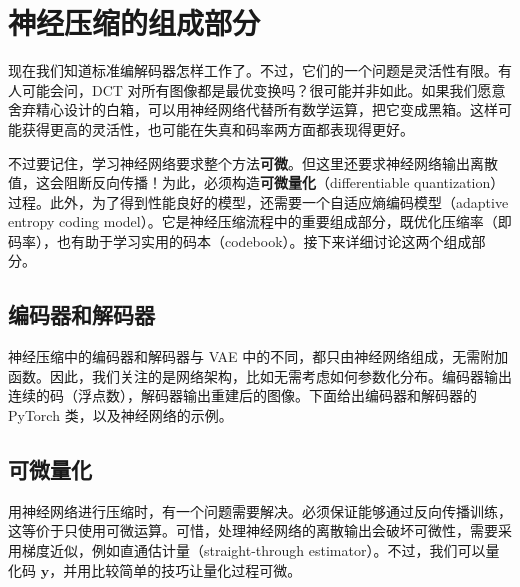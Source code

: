 \section{神经压缩的组成部分}
\label{sec:10-04}

现在我们知道标准编解码器怎样工作了。不过，它们的一个问题是灵活性有限。有人可能会问，DCT 对所有图像都是最优变换吗？很可能并非如此。如果我们愿意舍弃精心设计的白箱，可以用神经网络代替所有数学运算，把它变成黑箱。这样可能获得更高的灵活性，也可能在失真和码率两方面都表现得更好。

不过要记住，学习神经网络要求整个方法\textbf{可微}。但这里还要求神经网络输出离散值，这会阻断反向传播！为此，必须构造\textbf{可微量化}（differentiable quantization）过程。此外，为了得到性能良好的模型，还需要一个自适应熵编码模型（adaptive entropy coding model）。它是神经压缩流程中的重要组成部分，既优化压缩率（即码率），也有助于学习实用的码本（codebook）。接下来详细讨论这两个组成部分。

\subsection{编码器和解码器}

神经压缩中的编码器和解码器与 VAE 中的不同，都只由神经网络组成，无需附加函数。因此，我们关注的是网络架构，比如无需考虑如何参数化分布。编码器输出连续的码（浮点数），解码器输出重建后的图像。下面给出编码器和解码器的 PyTorch 类，以及神经网络的示例。



\subsection{可微量化}

用神经网络进行压缩时，有一个问题需要解决。必须保证能够通过反向传播训练，这等价于只使用可微运算。可惜，处理神经网络的离散输出会破坏可微性，需要采用梯度近似，例如直通估计量（straight-through estimator）。不过，我们可以量化码 $\mathbf y$，并用比较简单的技巧让量化过程可微。

